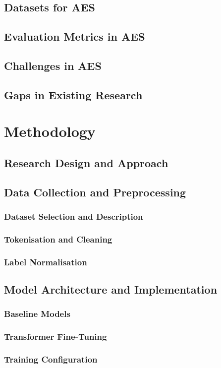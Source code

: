 \documentclass[12pt]{report}
\begin{document}
\section{Datasets for AES}
\section{Evaluation Metrics in AES}
\section{Challenges in AES}
\section{Gaps in Existing Research}

\chapter{Methodology}
\section{Research Design and Approach}
\section{Data Collection and Preprocessing}
\subsection{Dataset Selection and Description}
\subsection{Tokenisation and Cleaning}
\subsection{Label Normalisation}
\section{Model Architecture and Implementation}
\subsection{Baseline Models}
\subsection{Transformer Fine-Tuning}
\subsection{Training Configuration}
\end{document}

